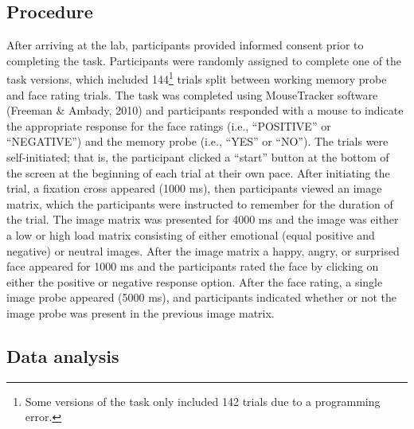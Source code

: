 \documentclass[man]{apa6}
\let\rmarkdownfootnote\footnote%
\def\footnote{\protect\rmarkdownfootnote}
\begin{document}
\hypertarget{procedure}{%
\subsection{Procedure}\label{procedure}}

After arriving at the lab, participants provided informed consent prior to completing the task. Participants were randomly assigned to complete one of the task versions, which included 144\footnote{Some versions of the task only included 142 trials due to a programming error.} trials split between working memory probe and face rating trials. The task was completed using MouseTracker software (Freeman \& Ambady, 2010) and participants responded with a mouse to indicate the appropriate response for the face ratings (i.e., \enquote{POSITIVE} or \enquote{NEGATIVE}) and the memory probe (i.e., \enquote{YES} or \enquote{NO}). The trials were self-initiated; that is, the participant clicked a \enquote{start} button at the bottom of the screen at the beginning of each trial at their own pace. After initiating the trial, a fixation cross appeared (1000 ms), then participants viewed an image matrix, which the participants were instructed to remember for the duration of the trial. The image matrix was presented for 4000 ms and the image was either a low or high load matrix consisting of either emotional (equal positive and negative) or neutral images. After the image matrix a happy, angry, or surprised face appeared for 1000 ms and the participants rated the face by clicking on either the positive or negative response option. After the face rating, a single image probe appeared (5000 ms), and participants indicated whether or not the image probe was present in the previous image matrix.

\hypertarget{data-analysis}{%
\subsection{Data analysis}\label{data-analysis}}
\end{document}
